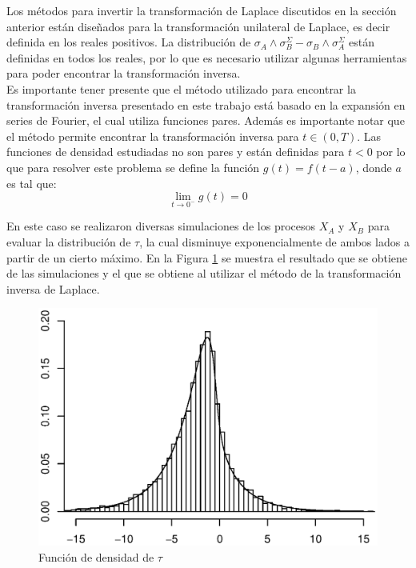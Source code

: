 \documentclass[11pt]{article}
\numberwithin{equation}{section} %
\begin{document}
Los métodos para invertir la transformación de Laplace discutidos en la sección anterior están diseñados para la transformación unilateral de Laplace, es decir definida en los reales positivos. La distribución de  $\sigma_A \land \sigma_B^\Sigma - \sigma_B \land \sigma_A^\Sigma$ están definidas en todos los reales, por lo que es necesario utilizar algunas herramientas para poder encontrar la transformación inversa.\\

Es importante tener presente que el método utilizado para encontrar la transformación inversa presentado en este trabajo está basado en la expansión en series de Fourier, el cual utiliza funciones pares. Además es importante notar que el método permite encontrar la transformación inversa para $t \in (0,T)$. Las funciones de densidad estudiadas no son pares y están definidas para $t<0$ por lo que para resolver este problema se define la función $g(t)=
f(t-a)$, donde $a$ es tal que:
\[
\lim_{t\to 0^-} g(t)=0
\]

En este caso se realizaron diversas simulaciones de los procesos $X_A$ y $X_B$ para evaluar la distribución de $\tau$, la cual disminuye exponencialmente de ambos lados a partir de un cierto máximo. En la Figura \ref{probmt} se muestra el resultado que se obtiene de las simulaciones y el que se obtiene al utilizar el método de la transformación inversa de Laplace.\\

\begin{figure}[htbp] \centering
\includegraphics[scale=0.75,trim=0 1cm 0 1cm]{probpm.eps}
\caption{Función de densidad de $\tau$}
\label{probmt}
\end{figure}
\end{document}
